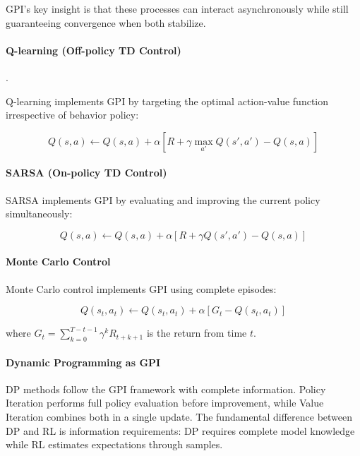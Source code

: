 GPI's key insight is that these processes can interact asynchronously while still guaranteeing convergence when both stabilize.

\paragraph{Q-learning (Off-policy TD Control)}.

Q-learning implements GPI by targeting the optimal action-value function irrespective of behavior policy:

\begin{equation}
    Q(s,a) \leftarrow Q(s,a) + \alpha [R + \gamma \max_{a'} Q(s',a') - Q(s,a)]
\end{equation}

\paragraph{SARSA (On-policy TD Control)}

SARSA implements GPI by evaluating and improving the current policy simultaneously:

\begin{equation}
    Q(s,a) \leftarrow Q(s,a) + \alpha [R + \gamma Q(s',a') - Q(s,a)]
\end{equation}

\paragraph{Monte Carlo Control}

Monte Carlo control implements GPI using complete episodes:

\begin{equation}
    Q(s_t,a_t) \leftarrow Q(s_t,a_t) + \alpha[G_t - Q(s_t,a_t)]
\end{equation}

where $G_t = \sum_{k=0}^{T-t-1} \gamma^k R_{t+k+1}$ is the return from time $t$.

\paragraph{Dynamic Programming as GPI}

DP methods follow the GPI framework with complete information. Policy Iteration performs full policy evaluation before improvement, while Value Iteration combines both in a single update. The fundamental difference between DP and RL is information requirements: DP requires complete model knowledge while RL estimates expectations through samples.

